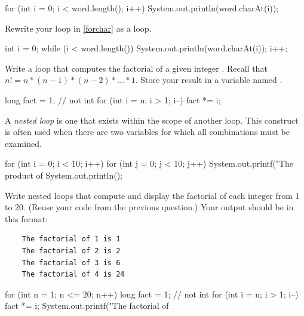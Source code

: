 \begin{answer}
\begin{javaans}
    for (int i = 0; i < word.length(); i++) {
        System.out.println(word.charAt(i));
    }
\end{javaans}
\end{answer}


\Q Rewrite your  loop in \ref{forchar} as a  loop.

\begin{answer}[6em]
\begin{javaans}
    int i = 0;
    while (i < word.length()) {
        System.out.println(word.charAt(i));
        i++;
    }
\end{javaans}
\end{answer}


\Q Write a loop that computes the factorial of a given integer .
Recall that $n! = n * (n-1) * (n-2) * \ldots * 1$.
Store your result in a variable named .

\begin{answer}[5em]
\begin{javaans}
    long fact = 1;  // not int
    for (int i = n; i > 1; i--) {
        fact *= i;
    }
\end{javaans}
\end{answer}


\Q \label{nested}
A \emph{nested loop} is one that exists within the scope of another loop.
This construct is often used when there are two variables for which all combinations must be examined.

\begin{javalst}
    for (int i = 0; i < 10; i++) {
        for (int j = 0; j < 10; j++) {
            System.out.printf("The product of %
        }
        System.out.println();
    }
\end{javalst}

Write nested loops that compute and display the factorial of each integer from 1 to 20.
(Reuse your code from the previous question.)
Your output should be in this format:

\vspace{-1ex}
\begin{verbatim}
    The factorial of 1 is 1
    The factorial of 2 is 2
    The factorial of 3 is 6
    The factorial of 4 is 24
\end{verbatim}
\vspace{-1ex}

\begin{answer}[9em]
\begin{javaans}
    for (int n = 1; n <= 20; n++) {
        long fact = 1;  // not int
        for (int i = n; i > 1; i--) {
            fact *= i;
        }
        System.out.printf("The factorial of %
    }
\end{javaans}
\end{answer}
